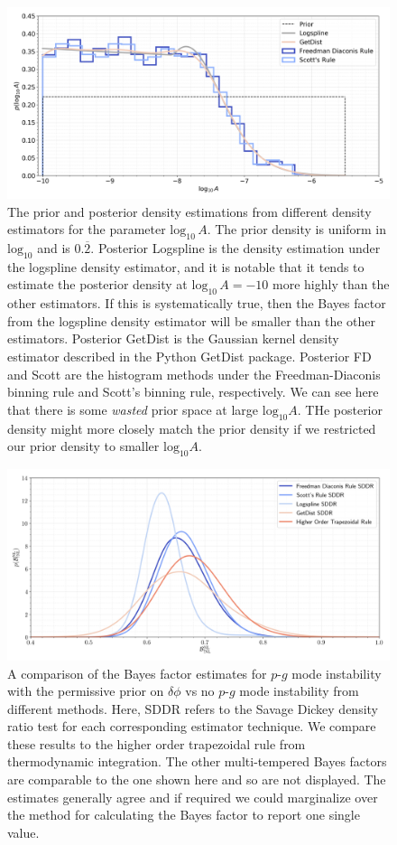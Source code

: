 \begin{figure}[th]
\centering
\includegraphics[width=0.9\columnwidth]{figs/chapter6/prior_posterior_sddr.png}
\caption{The prior and posterior density estimations from different density estimators for the parameter $\mathrm{log}_{10} \, A$. The prior density is uniform in $\mathrm{log}_{10}$ and is $0.\overbar{2}$. Posterior Logspline is the density estimation under the logspline density estimator, and it is notable that it tends to estimate the posterior density at $\mathrm{log}_{10} \, A = -10$ more highly than the other estimators. If this is systematically true, then the Bayes factor from the logspline density estimator will be smaller than the other estimators. Posterior GetDist is the Gaussian kernel density estimator described in the Python GetDist package. Posterior FD and Scott are the histogram methods under the Freedman-Diaconis binning rule and Scott's binning rule, respectively. We can see here that there is some \textit{wasted} prior space at large $\mathrm{log}_{10} A$. THe posterior density might more closely match the prior density if we restricted our prior density to smaller $\mathrm{log}_{10} A$.}
\label{fig:density_estimators}
\end{figure}

\begin{figure}[th]
\centering
\includegraphics[width=0.9\columnwidth]{figs/chapter6/sddr_bayes_factor.png}
\caption{A comparison of the Bayes factor estimates for $p$-$g$ mode instability with the permissive prior on $\delta \phi$ vs no $p$-$g$ mode instability from different methods. Here, SDDR refers to the Savage Dickey density ratio test for each corresponding estimator technique. We compare these results to the higher order trapezoidal rule from thermodynamic integration. The other multi-tempered Bayes factors are comparable to the one shown here and so are not displayed. The estimates generally agree and if required we could marginalize over the method for calculating the Bayes factor to report one single value.}
\label{fig:sddr_bayes_factor_comparisons}
\end{figure}

